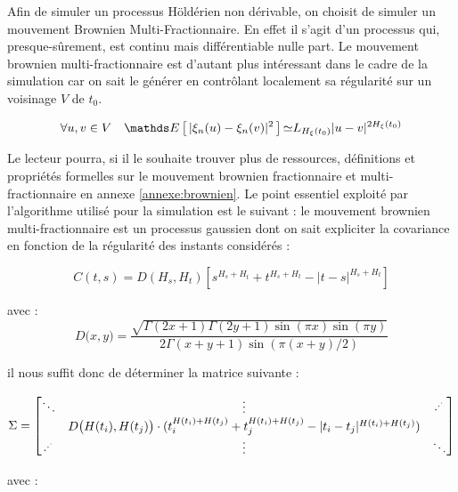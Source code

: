 Afin de simuler un processus Höldérien non dérivable, on choisit de simuler un mouvement Brownien Multi-Fractionnaire. En effet il s'agit d'un processus qui, presque-sûrement, est continu mais différentiable nulle part. Le mouvement brownien multi-fractionnaire est d'autant plus intéressant dans le cadre de la simulation car on sait le générer en contrôlant localement sa régularité sur un voisinage $V$ de $t_0$.

\begin{equation*}
	\forall u,v \in V \quad	\esperance{ | \xi_n(u) - \xi_n(v) |^2 } \mathbf{\simeq} L_{H_{\xi}(t_0) } |u - v|^{2 H_{\xi}(t_0)}
\end{equation*}

Le lecteur pourra, si il le souhaite trouver plus de ressources, définitions et propriétés formelles sur le mouvement brownien fractionnaire et multi-fractionnaire en annexe \ref{annexe:brownien}. Le point essentiel exploité par l'algorithme utilisé pour la simulation est le suivant : le mouvement brownien multi-fractionnaire est un processus gaussien dont on sait expliciter la covariance en fonction de la régularité des instants considérés :

$$
	C(t,s) = D(H_{s},H_{t})\left[s^{H_{s}+H_{t}}+t^{H_{s}+H_{t}}-|t-s|^{H_{s}+H_{t}}\right]
$$

avec :
$$
	D\bigl(x,y\bigr) = \frac{{\sqrt{\Gamma(2x+1)\Gamma(2y+1)\sin(\pi x)\sin(\pi y)}}}{2\Gamma(x+y+1)\sin(\pi(x+y)/2)}
$$

il nous suffit donc de déterminer la matrice suivante :

$$
	\Sigma = \begin{bmatrix}
		\ddots &                \vdots                                                                                                  & \cdot^{\cdot^{\cdot^{}}}
		\\
		       & D\bigl(H(t_i), H(t_j) \bigr)\cdot( t_i^{H(t_i) + H(t_j)} + t_j^{H(t_i) + H(t_j)} - |t_i-t_j|^{H(t_i) + H(t_j)} ) &
		\\
		    \cdot^{\cdot^{\cdot^{}}}   &       \vdots                                                                                                           & \ddots
	\end{bmatrix}
$$

avec :

